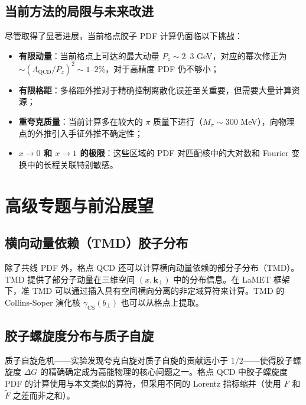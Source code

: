 \documentclass[11pt,a4paper]{ctexart}
\begin{document}
\subsection{当前方法的局限与未来改进}

尽管取得了显著进展，当前格点胶子 PDF 计算仍面临以下挑战：
\begin{itemize}
  \item \textbf{有限动量}：当前格点上可达的最大动量 $P_z \sim 2\text{--}3$ GeV，对应的幂次修正为 $\sim (\Lambda_{\text{QCD}}/P_z)^2 \sim 1\text{--}2\%$，对于高精度 PDF 仍不够小；
  \item \textbf{有限格距}：多格距外推对于精确控制离散化误差至关重要，但需要大量计算资源；
  \item \textbf{重夸克质量}：当前计算多在较大的 $\pi$ 质量下进行（$M_\pi \sim 300$ MeV），向物理点的外推引入手征外推不确定性；
  \item \textbf{$x \to 0$ 和 $x \to 1$ 的极限}：这些区域的 PDF 对匹配核中的大对数和 Fourier 变换中的长程关联特别敏感。
\end{itemize}

\section{高级专题与前沿展望}

\subsection{横向动量依赖（TMD）胶子分布}

除了共线 PDF 外，格点 QCD 还可以计算横向动量依赖的部分子分布（TMD）。TMD 提供了部分子动量在三维空间 $(x, \mathbf{k}_\perp)$ 中的分布信息。在 LaMET 框架下，准 TMD 可以通过插入具有空间横向分离的非定域算符来计算。TMD 的 Collins-Soper 演化核 $\gamma_{\text{CS}}(b_\perp)$ 也可以从格点上提取。

\subsection{胶子螺旋度分布与质子自旋}

质子自旋危机——实验发现夸克自旋对质子自旋的贡献远小于 $1/2$——使得胶子螺旋度 $\Delta G$ 的精确确定成为高能物理的核心问题之一。格点 QCD 中胶子螺旋度 PDF 的计算使用与本文类似的算符，但采用不同的 Lorentz 指标缩并（使用 $F$ 和 $\tilde{F}$ 之差而非之和）。
\end{document}
